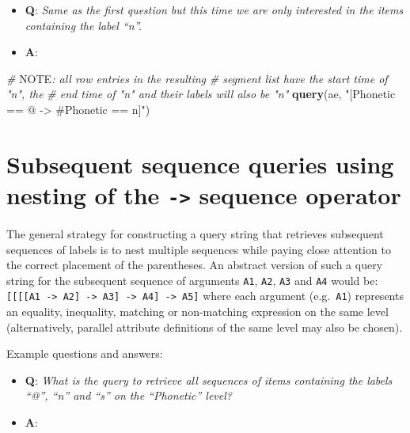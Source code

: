 \documentclass[]{book}
\newenvironment{Shaded}{\begin{snugshade}}{\end{snugshade}}
\newcommand{\AlertTok}[1]{\textcolor[rgb]{0.94,0.16,0.16}{#1}}
\newcommand{\CommentTok}[1]{\textcolor[rgb]{0.56,0.35,0.01}{\textit{#1}}}
\newcommand{\KeywordTok}[1]{\textcolor[rgb]{0.13,0.29,0.53}{\textbf{#1}}}
\newcommand{\NormalTok}[1]{#1}
\newcommand{\StringTok}[1]{\textcolor[rgb]{0.31,0.60,0.02}{#1}}
\providecommand{\tightlist}{%
  \setlength{\itemsep}{0pt}\setlength{\parskip}{0pt}}
\begin{document}
\begin{itemize}
\tightlist
\item
  \textbf{Q}: \emph{Same as the first question but this time we are only interested in the items containing the label ``n''.}
\item
  \textbf{A}:
\end{itemize}

\begin{Shaded}
\begin{Highlighting}[]
\CommentTok{# }\AlertTok{NOTE}\CommentTok{: all row entries in the resulting}
\CommentTok{# segment list have the start time of "n", the}
\CommentTok{# end time of "n" and their labels will also be "n"}
\KeywordTok{query}\NormalTok{(ae, }\StringTok{"[Phonetic == @ -> #Phonetic == n]"}\NormalTok{)}
\end{Highlighting}
\end{Shaded}

\hypertarget{subsequent-sequence-queries-using-nesting-of-the---sequence-operator}{%
\section{\texorpdfstring{Subsequent sequence queries using nesting of the \texttt{-\textgreater{}} sequence operator}{Subsequent sequence queries using nesting of the -\textgreater{} sequence operator}}\label{subsequent-sequence-queries-using-nesting-of-the---sequence-operator}}

The general strategy for constructing a query string that retrieves subsequent sequences of labels is to nest multiple sequences while paying close attention to the correct placement of the parentheses. An abstract version of such a query string for the subsequent sequence of arguments \texttt{A1}, \texttt{A2}, \texttt{A3} and \texttt{A4} would be: \texttt{{[}{[}{[}{[}A1\ -\textgreater{}\ A2{]}\ -\textgreater{}\ A3{]}\ -\textgreater{}\ A4{]}\ -\textgreater{}\ A5{]}} where each argument (e.g.~\texttt{A1}) represents an equality, inequality, matching or non-matching expression on the same level (alternatively, parallel attribute definitions of the same level may also be chosen).

Example questions and answers:

\begin{itemize}
\tightlist
\item
  \textbf{Q}: \emph{What is the query to retrieve all sequences of items containing the labels ``@'', ``n'' and ``s'' on the ``Phonetic'' level?}
\item
  \textbf{A}:
\end{itemize}
\end{document}
